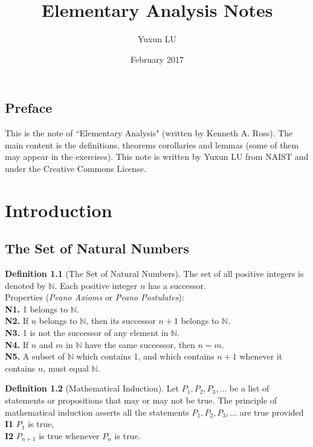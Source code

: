 \documentclass{book}
\title{Elementary Analysis Notes}
\author{Yuxun LU}
\date{February 2017}
\theoremstyle{definition}
\newtheorem{definition}{Definition}[section]
\begin{document}
\maketitle
\section*{Preface}
This is the note of ``Elementary Analysis" (written by Kenneth A. Ross). The main content is the definitions, theorems corollaries and lemmas (some of them may appear in the exercises). This note is written by Yuxun LU from NAIST and under the Creative Commons License.
\tableofcontents
\mainmatter
\chapter{Introduction}
\section{The Set of Natural Numbers}

\begin{definition}[The Set of Natural Numbers]
The set of all positive integers is denoted by $\mathbb{N}$. Each positive integer $n$ has a successor.
\\ Properties (\textit{Peano Axioms} or \textit{Peano Postulates}):
\\ \textbf{N1.} 1 belongs to $\mathbb{N}$.
\\ \textbf{N2.} If $n$ belongs to $\mathbb{N}$, then its successor $n+1$ belongs to $\mathbb{N}$.
\\ \textbf{N3.} 1 is not the successor of any element in $\mathbb{N}$.
\\ \textbf{N4.} If $n$ and $m$ in $\mathbb{N}$ have the same successor, then $n=m$.
\\ \textbf{N5.} A subset of $\mathbb{N}$ which contains 1, and which contains $n+1$ whenever it contains $n$, must equal $\mathbb{N}$.
\end{definition}
\begin{definition}[Mathematical Induction]
Let $P_1, P_2, P_3, ...$ be a list of statements or propositions that may or may not be true. The principle of mathematical induction asserts all the statements $P_1, P_2, P_3, ...$ are true provided
\\ \textbf{I1} $P_1$ is true,
\\ \textbf{I2} $P_{n+1}$ is true whenever $P_n$ is true.
\end{definition}
\end{document}
